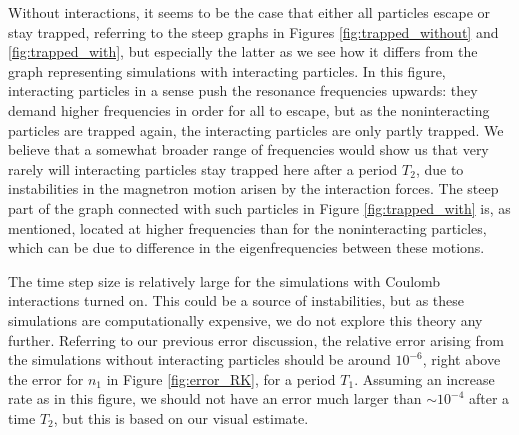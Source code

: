 Without interactions, it seems to be the case that either all particles escape or stay trapped, referring to the steep graphs in Figures \ref{fig:trapped_without} and \ref{fig:trapped_with}, but especially the latter as we see how it differs from the graph representing simulations with interacting particles. In this figure, interacting particles in a sense push the resonance frequencies upwards: they demand higher frequencies in order for all to escape, but as the noninteracting particles are trapped again, the interacting particles are only partly trapped. We believe that a somewhat broader range of frequencies would show us that very rarely will interacting particles stay trapped here after a period $T_2$, due to instabilities in the magnetron motion arisen by the interaction forces. The steep part of the graph connected with such particles in Figure \ref{fig:trapped_with} is, as mentioned, located at higher frequencies than for the noninteracting particles, which can be due to difference in the eigenfrequencies between these motions.

The time step size is relatively large for the simulations with Coulomb interactions turned on. This could be a source of instabilities, but as these simulations are computationally expensive, we do not explore this theory any further. Referring to our previous error discussion, the relative error arising from the simulations without interacting particles should be around $10^{-6}$, right above the error for $n_1$ in Figure \ref{fig:error_RK}, for a period $T_1$. Assuming an increase rate as in this figure, we should not have an error much larger than $\sim 10^{-4}$ after a time $T_2$, but this is based on our visual estimate. 


